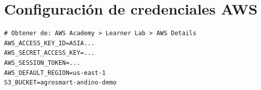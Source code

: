 \documentclass[12pt,a4paper]{article}
\begin{document}
\section{Configuración de credenciales AWS}

\begin{lstlisting}[style=bashstyle, caption={Archivo .env para AWS Academy}]
# Obtener de: AWS Academy > Learner Lab > AWS Details
AWS_ACCESS_KEY_ID=ASIA...
AWS_SECRET_ACCESS_KEY=...
AWS_SESSION_TOKEN=...
AWS_DEFAULT_REGION=us-east-1
S3_BUCKET=agrosmart-andino-demo
\end{lstlisting}
\end{document}
